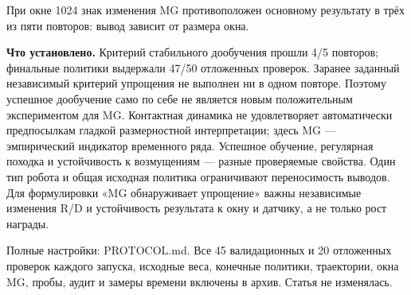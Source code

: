 \documentclass[10pt,a4paper]{article}
\begin{document}
При окне 1024 знак изменения MG противоположен основному результату в трёх из пяти повторов: вывод зависит от размера окна.

\textbf{Что установлено.} Критерий стабильного дообучения прошли 4/5 повторов; финальные политики выдержали 47/50 отложенных проверок. Заранее заданный независимый критерий упрощения не выполнен ни в одном повторе. Поэтому успешное дообучение само по себе не является новым положительным экспериментом для MG. Контактная динамика не удовлетворяет автоматически предпосылкам гладкой размерностной интерпретации; здесь MG --- эмпирический индикатор временного ряда. Успешное обучение, регулярная походка и устойчивость к возмущениям --- разные проверяемые свойства. Один тип робота и общая исходная политика ограничивают переносимость выводов. Для формулировки «MG обнаруживает упрощение» важны независимые изменения R/D и устойчивость результата к окну и датчику, а не только рост награды.

Полные настройки: PROTOCOL.md. Все 45 валидационных и 20 отложенных проверок каждого запуска, исходные веса, конечные политики, траектории, окна MG, пробы, аудит и замеры времени включены в архив. Статья не изменялась.
\end{document}
